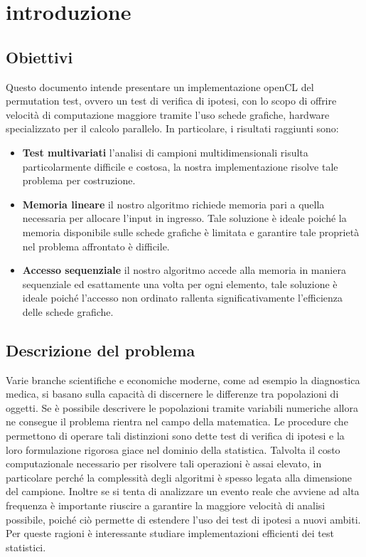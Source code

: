 \section{introduzione}


\subsection{Obiettivi}
Questo documento intende presentare un implementazione openCL del permutation test, ovvero un test di verifica di ipotesi,  con lo scopo di offrire velocità di computazione maggiore tramite l'uso schede grafiche, hardware specializzato per il calcolo parallelo. 
In particolare, i risultati raggiunti sono:
\begin{itemize}
	\item \textbf{Test multivariati} l'analisi di campioni multidimensionali risulta particolarmente difficile e costosa, la nostra implementazione risolve tale problema per costruzione.
	\item \textbf{Memoria lineare} il nostro algoritmo richiede memoria pari a quella necessaria per allocare l'input in ingresso. Tale soluzione è ideale poiché la memoria disponibile sulle schede grafiche è limitata e garantire tale proprietà nel problema affrontato è difficile.
	\item \textbf{Accesso sequenziale} il nostro algoritmo accede alla memoria in maniera sequenziale ed esattamente una volta per ogni elemento, tale soluzione è ideale poiché l'accesso non ordinato rallenta significativamente l'efficienza delle schede grafiche.
\end{itemize}


\subsection{Descrizione del problema}
Varie branche scientifiche e economiche moderne, come ad esempio la diagnostica medica, si basano sulla capacità di discernere le differenze tra popolazioni di oggetti. Se è possibile descrivere le popolazioni tramite variabili numeriche allora ne consegue il problema rientra nel campo della matematica.
Le procedure che permettono di operare tali distinzioni sono dette test di verifica di ipotesi e la loro formulazione rigorosa giace nel dominio della statistica.
Talvolta il costo computazionale necessario per risolvere tali operazioni è assai elevato, in particolare perché la complessità degli algoritmi è spesso legata alla dimensione del campione. Inoltre se si tenta di analizzare un evento reale che avviene ad alta frequenza è importante riuscire a garantire la maggiore velocità di analisi possibile, poiché ciò permette di estendere l'uso dei test di ipotesi a nuovi ambiti.
Per queste ragioni è interessante studiare implementazioni efficienti dei test statistici.

